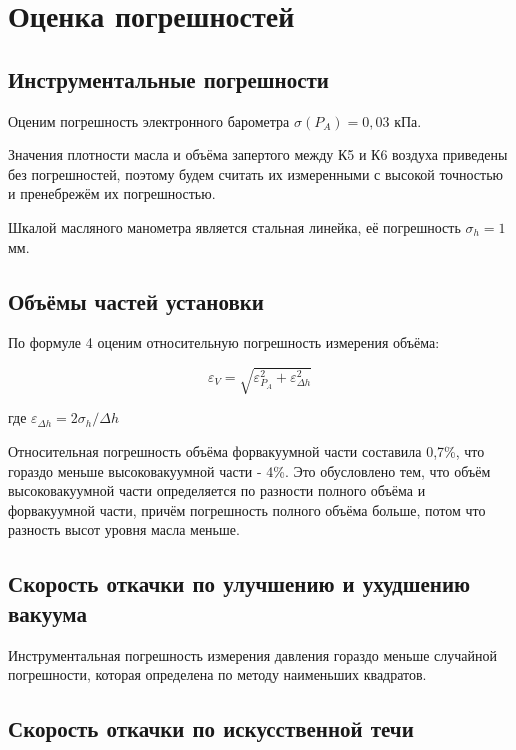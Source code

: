 \documentclass[14pt]{article}
\begin{document}
	
\section*{Оценка погрешностей}
	\subsection*{Инструментальные погрешности}
	\hspace{4mm} Оценим погрешность электронного барометра $\sigma(P_A) = 0,03$ кПа.
	
	Значения плотности масла и объёма запертого между К5 и К6 воздуха приведены без погрешностей, поэтому будем считать их измеренными с высокой точностью и пренебрежём их погрешностью.
	
	Шкалой масляного манометра является стальная линейка, её погрешность $\sigma_h = 1$ мм.
	
	

	\subsection*{Объёмы частей установки}
		\hspace{4mm} По формуле 4 оценим относительную погрешность измерения объёма:
		
		\begin{equation}
			\varepsilon_V = \sqrt{\varepsilon_{P_A}^2 + \varepsilon_{\Delta h}^2}
		\end{equation}	
	
		где $\varepsilon_{\Delta h} = 2\sigma_h / \Delta h$
		
		Относительная погрешность объёма форвакуумной части составила 0,7\%, что гораздо меньше высоковакуумной части - 4\%. Это обусловлено тем, что объём высоковакуумной части определяется по разности полного объёма и форвакуумной части, причём погрешность полного объёма больше, потом что разность высот уровня масла меньше. 
		
	\subsection*{Скорость откачки по улучшению и ухудшению вакуума}
	
		\hspace{4mm} Инструментальная погрешность измерения давления гораздо меньше случайной погрешности, которая определена по методу наименьших квадратов.
		
	\subsection*{Скорость откачки по искусственной течи}
	
\end{document}

